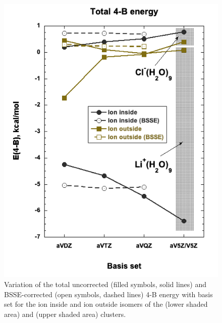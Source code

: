 \begin{figure}[t]
\uwsinglespace
\centering
\includegraphics[width=.5\textwidth]{Figures/Chapter_3/figure_6.pdf}
\begin{spacing}{1.0}
\caption[Variation of the total uncorrected (filled symbols, solid lines) and BSSE-corrected (open symbols, dashed lines) 4-B energy with basis set for the ion inside and ion outside isomers of the  (lower shaded area) and  (upper shaded area) clusters.]{Variation of the total uncorrected (filled symbols, solid lines) and BSSE-corrected (open symbols, dashed lines) 4-B energy with basis set for the ion inside and ion outside isomers of the  (lower shaded area) and  (upper shaded area) clusters.}\label{fig:MBE_II_6}
\end{spacing}
\end{figure}